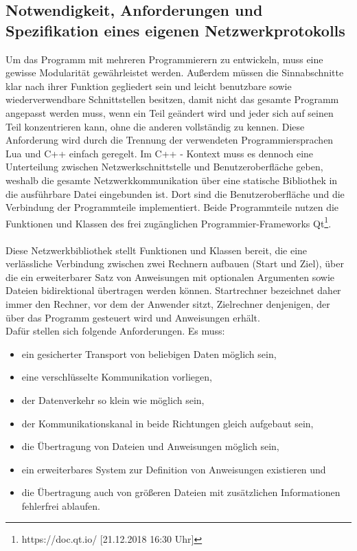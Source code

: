 \subsection{Notwendigkeit, Anforderungen und Spezifikation eines eigenen Netzwerkprotokolls}
Um das Programm mit mehreren Programmierern zu entwickeln, muss eine gewisse Modularität gewährleistet werden. Außerdem müssen die Sinnabschnitte klar nach ihrer Funktion gegliedert sein und leicht benutzbare sowie wiederverwendbare Schnittstellen besitzen, damit nicht das gesamte Programm angepasst werden muss, wenn ein Teil geändert wird und jeder sich auf seinen Teil konzentrieren kann, ohne die anderen vollständig zu kennen.
Diese Anforderung wird durch die Trennung der verwendeten Programmiersprachen Lua und C++ einfach geregelt. Im C++ - Kontext muss es dennoch eine Unterteilung zwischen Netzwerkschnittstelle und Benutzeroberfläche geben, weshalb die gesamte Netzwerkkommunikation über eine statische Bibliothek in die ausführbare Datei eingebunden ist. 
Dort sind die Benutzeroberfläche und die Verbindung der Programmteile implementiert. 
Beide Programmteile nutzen die Funktionen und Klassen des frei zugänglichen Programmier-Frameworks Qt\footnote{https://doc.qt.io/ [21.12.2018 16:30 Uhr]}.\\\\
Diese Netzwerkbibliothek stellt Funktionen und Klassen bereit, die eine verlässliche Verbindung zwischen zwei Rechnern aufbauen (Start und Ziel), über die ein erweiterbarer Satz von Anweisungen mit optionalen Argumenten sowie Dateien bidirektional übertragen werden können.
Startrechner bezeichnet daher immer den Rechner, vor dem der Anwender sitzt, Zielrechner denjenigen, der über das Programm gesteuert wird und Anweisungen erhält.\\
Dafür stellen sich folgende Anforderungen. Es muss:\\

\begin{itemize}
\item ein gesicherter Transport von beliebigen Daten möglich sein,
\item eine verschlüsselte Kommunikation vorliegen,
\item der Datenverkehr so klein wie möglich sein,
\item der Kommunikationskanal in beide Richtungen gleich aufgebaut sein,
\item die Übertragung von Dateien und Anweisungen möglich sein,
\item ein erweiterbares System zur Definition von Anweisungen existieren und
\item die Übertragung auch von größeren Dateien mit zusätzlichen Informationen fehlerfrei ablaufen.
\end{itemize}

